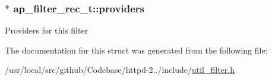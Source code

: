 \subsubsection[{\texorpdfstring{providers}{providers}}]{$\ast$ ap\+\_\+filter\+\_\+rec\+\_\+t\+::providers}\hypertarget{structap__filter__rec__t_a20f4b587f03697e977ff8df2247a463b}{}\label{structap__filter__rec__t_a20f4b587f03697e977ff8df2247a463b}
Providers for this filter 

The documentation for this struct was generated from the following file\+:\begin{DoxyCompactItemize}
\item 
/usr/local/src/github/\+Codebase/httpd-\/2../include/\hyperlink{util__filter_8h}{util\+\_\+filter.\+h}\end{DoxyCompactItemize}
